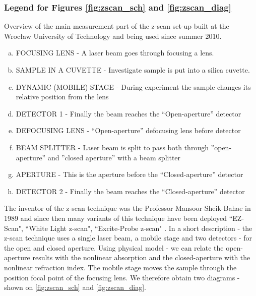 \documentclass[12pt,twoside,a4paper]{article}
\numberwithin{equation}{subsection}
\numberwithin{figure}{subsection}
\begin{document}
\subsubsection*{Legend for Figures \ref{fig:zscan_sch} and \ref{fig:zscan_diag}}
Overview of the main measurement part of the z-scan set-up built at the Wrocław University of Technology and being used
since summer 2010.
 
\begin{enumerate}[(a)]
  \item FOCUSING LENS - A laser beam goes through focusing a lens.
  \item SAMPLE IN A CUVETTE - Investigate sample is put into a silica cuvette.
  \item DYNAMIC (MOBILE) STAGE - During experiment the sample changes its relative position from the lens
  \item DETECTOR 1 - Finally the beam reaches the ``Open-aperture'' detector  
  \item DEFOCUSING LENS  - ``Open-aperture'' defocusing lens before detector
  \item BEAM SPLITTER - Laser beam is split to pass both through ''open-aperture'' and ''closed aperture'' with a beam splitter
  \item APERTURE - This is the aperture before the ``Closed-aperture'' detector
  \item DETECTOR 2 - Finally the beam reaches the ``Closed-aperture'' detector
\end{enumerate}

The inventor of the z-scan technique was the Professor Mansoor Sheik-Bahae in 1989 \cite{bahae_sensitive} and since then many variants of this
technique have been deployed ``EZ-Scan", ``White Light z-scan", ``Excite-Probe z-scan" \cite{newport_application}. In a short
description - the z-scan technique uses a single laser beam, a mobile stage and two detectors - for the open and closed aperture.
Using physical model - we can relate the open-aperture results with the nonlinear absorption and the closed-aperture with the
nonlinear refraction index. The mobile stage moves the sample through the position focal point of the focusing lens. We therefore obtain
two diagrams - shown on \ref{fig:zscan_sch} and \ref{fig:zscan_diag}.
\end{document}
